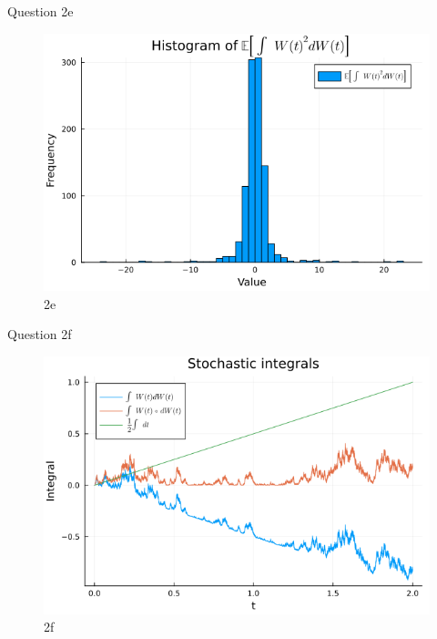 \documentclass[compress,12pt]{beamer}
\begin{document}
\begin{frame}{Question 2e}
      \begin{figure}[H]
            \centering
            \includegraphics[scale=0.5]{imgs/2e.png}
            \caption{2e}
            \label{fig:2e}
      \end{figure}

\end{frame}

\begin{frame}{Question 2f}
      \begin{figure}[H]
            \centering
            \includegraphics[scale=0.5]{imgs/2f.png}
            \caption{2f}
            \label{fig:2f}
      \end{figure}

\end{frame}
\end{document}
